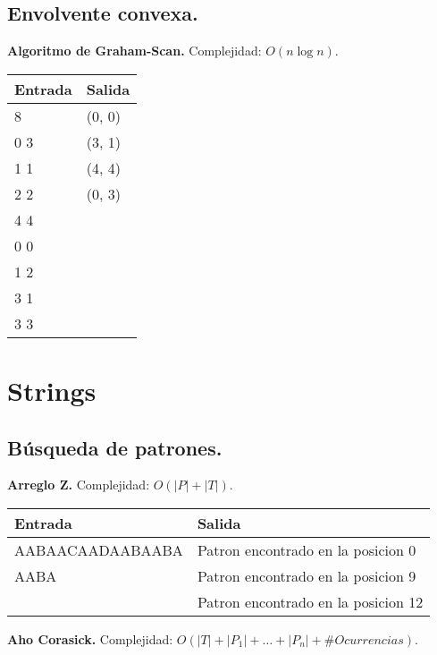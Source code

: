 \documentclass[10pt, letterpaper, twoside]{article}
\begin{document}


\subsection{Envolvente convexa.}

\textbf{Algoritmo de Graham-Scan.} Complejidad: $O(n \log n)$.



\begin{tabular}{|p{7cm}|p{7cm}|}
\hline
\textbf{Entrada} & \textbf{Salida}\\ \hline
8   & (0, 0) \\
0 3 & (3, 1) \\
1 1 & (4, 4) \\
2 2 & (0, 3) \\
4 4 & \\
0 0 & \\
1 2 & \\
3 1 & \\
3 3 & \\ \hline
\end{tabular}


\section{Strings}

\subsection{Búsqueda de patrones.}

\textbf{Arreglo Z.} Complejidad: $O(|P| + |T|)$.



\begin{tabular}{|p{7cm}|p{7cm}|}
\hline
\textbf{Entrada} & \textbf{Salida}\\ \hline
AABAACAADAABAABA & Patron encontrado en la posicion 0\\
AABA             & Patron encontrado en la posicion 9\\
                 & Patron encontrado en la posicion 12\\ \hline
\end{tabular}\bigskip

\textbf{Aho Corasick.} Complejidad: $O(|T| + |P_1| + \ldots + |P_n| + \#Ocurrencias)$.
\end{document}
